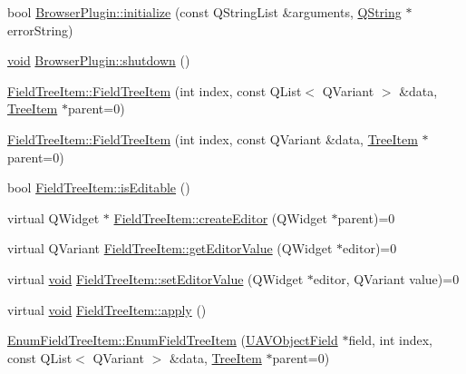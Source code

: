 \begin{DoxyCompactItemize}
\item 
bool \hyperlink{group___u_a_v_object_browser_plugin_gac452314c7c28ab0c1fb1bb935bed5d0d}{\-Browser\-Plugin\-::initialize} (const \-Q\-String\-List \&arguments, \hyperlink{group___u_a_v_objects_plugin_gab9d252f49c333c94a72f97ce3105a32d}{\-Q\-String} $\ast$error\-String)
\item 
\hyperlink{group___u_a_v_objects_plugin_ga444cf2ff3f0ecbe028adce838d373f5c}{void} \hyperlink{group___u_a_v_object_browser_plugin_ga8d7b6113315a8625ce56679504594fa3}{\-Browser\-Plugin\-::shutdown} ()
\item 
\hyperlink{group___u_a_v_object_browser_plugin_ga9ada7d4ed9c60eb20abec8cfc8e99960}{\-Field\-Tree\-Item\-::\-Field\-Tree\-Item} (int index, const \-Q\-List$<$ \-Q\-Variant $>$ \&data, \hyperlink{class_tree_item}{\-Tree\-Item} $\ast$parent=0)
\item 
\hyperlink{group___u_a_v_object_browser_plugin_gab23936d93e6b5a9121347243b8121ddb}{\-Field\-Tree\-Item\-::\-Field\-Tree\-Item} (int index, const \-Q\-Variant \&data, \hyperlink{class_tree_item}{\-Tree\-Item} $\ast$parent=0)
\item 
bool \hyperlink{group___u_a_v_object_browser_plugin_ga9451c80f28fd4e9cf1039ccd6c5a578f}{\-Field\-Tree\-Item\-::is\-Editable} ()
\item 
virtual \-Q\-Widget $\ast$ \hyperlink{group___u_a_v_object_browser_plugin_ga06084172e5bbdc94cbe4af05faa1402a}{\-Field\-Tree\-Item\-::create\-Editor} (\-Q\-Widget $\ast$parent)=0
\item 
virtual \-Q\-Variant \hyperlink{group___u_a_v_object_browser_plugin_ga1807c283f6304e53fc9d655e087ef1c0}{\-Field\-Tree\-Item\-::get\-Editor\-Value} (\-Q\-Widget $\ast$editor)=0
\item 
virtual \hyperlink{group___u_a_v_objects_plugin_ga444cf2ff3f0ecbe028adce838d373f5c}{void} \hyperlink{group___u_a_v_object_browser_plugin_gaaa08b0cb3b19768b9dad7281248ce90b}{\-Field\-Tree\-Item\-::set\-Editor\-Value} (\-Q\-Widget $\ast$editor, \-Q\-Variant value)=0
\item 
virtual \hyperlink{group___u_a_v_objects_plugin_ga444cf2ff3f0ecbe028adce838d373f5c}{void} \hyperlink{group___u_a_v_object_browser_plugin_gac0c6018349019bfac1859518a7403871}{\-Field\-Tree\-Item\-::apply} ()
\item 
\hyperlink{group___u_a_v_object_browser_plugin_ga5f84bbb8e18a37ce79f64461e789f788}{\-Enum\-Field\-Tree\-Item\-::\-Enum\-Field\-Tree\-Item} (\hyperlink{class_u_a_v_object_field}{\-U\-A\-V\-Object\-Field} $\ast$field, int index, const \-Q\-List$<$ \-Q\-Variant $>$ \&data, \hyperlink{class_tree_item}{\-Tree\-Item} $\ast$parent=0)

\end{DoxyCompactItemize}
